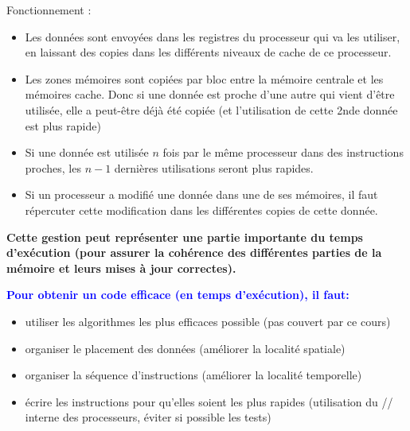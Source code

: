 \documentclass{beamer}
\begin{document}
\begin{frame}[fragile]
Fonctionnement :

\begin{itemize}
	\item Les donn\'ees sont envoy\'ees dans les registres du processeur qui va les utiliser, en laissant des copies dans les diff\'erents niveaux de cache de ce processeur. 
	\vfill
	
	\item Les zones m\'emoires sont copi\'ees par bloc entre la m\'emoire centrale et les m\'emoires cache. Donc si une donn\'ee est proche d'une autre qui vient d'\^etre utilis\'ee, elle a peut-\^etre d\'ej\`a \'et\'e copi\'ee (et l'utilisation de cette 2nde donn\'ee est plus rapide)	
\end{itemize}
	\vfill
\end{frame}

\begin{frame}[fragile]
	
\begin{itemize}
	\item Si une donn\'ee est utilis\'ee $n$ fois par le m\^eme processeur dans des instructions proches, les $n-1$ derni\`eres utilisations seront plus rapides.
\vfill

	\item Si un processeur a modifi\'e une donn\'ee dans une de ses m\'emoires, il faut r\'epercuter cette modification dans les diff\'erentes copies de cette donn\'ee.
	\vfill
\end{itemize}
	\vfill

{\bf Cette gestion peut repr\'esenter une partie im\-por\-tante du temps d'ex\'ecution (pour assurer la coh\'erence des diff\'erentes parties de la m\'emoire et leurs mises \`a jour correctes).}
	\vfill


\end{frame}

\begin{frame}[fragile]

\bf
\textcolor{blue}{Pour obtenir un code efficace (en temps d'ex\'ecution), il faut:}

\begin{itemize}
	\item utiliser les algorithmes les plus efficaces possible (pas couvert par ce cours)
	
	\item organiser le placement des donn\'ees (am\'eliorer la localit\'e spatiale)
	
	\item organiser la s\'equence d'instructions (am\'eliorer la localit\'e temporelle)

	\item \'ecrire les instructions pour qu'elles soient les plus rapides (utilisation du // interne des processeurs, \'eviter si possible les tests)
\end{itemize}
\end{frame}
\end{document}
